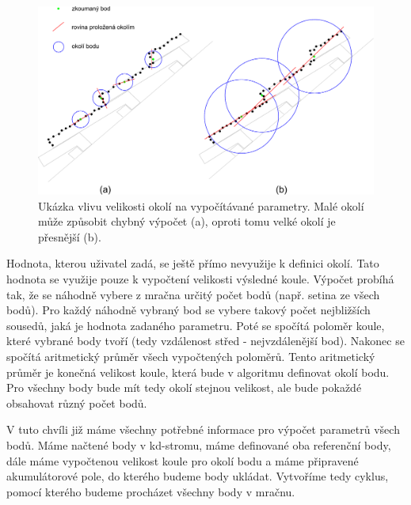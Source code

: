 \documentclass[11pt,twoside,a4paper]{book}
\begin{document}
\begin{figure}[ht]
\begin{center}
\includegraphics[width=\textwidth]{figures/strecha-all}
\caption{Ukázka vlivu velikosti okolí na vypočítávané parametry. Malé okolí může způsobit chybný výpočet (a), oproti tomu velké okolí je přesnější (b).}
\label{fig:strecha}
\end{center}
\end{figure}

Hodnota, kterou uživatel zadá, se ještě přímo nevyužije k definici okolí. Tato hodnota se využije pouze k vypočtení velikosti výsledné koule. Výpočet probíhá tak, že se náhodně vybere z mračna určitý počet bodů (např. setina ze všech bodů). Pro každý náhodně vybraný bod se vybere takový počet nejbližších sousedů, jaká je hodnota zadaného parametru. Poté se spočítá poloměr koule, které vybrané body tvoří (tedy vzdálenost střed - nejvzdálenější bod). Nakonec se spočítá aritmetický průměr všech vypočtených poloměrů. Tento aritmetický průměr je konečná velikost koule, která bude v algoritmu definovat okolí bodu. Pro všechny body bude mít tedy okolí stejnou velikost, ale bude pokaždé obsahovat různý počet bodů.

V tuto chvíli již máme všechny potřebné informace pro výpočet parametrů všech bodů. Máme načtené body v kd-stromu, máme definované oba referenční body, dále máme vypočtenou velikost koule pro okolí bodu a máme připravené akumulátorové pole, do kterého budeme body ukládat. Vytvoříme tedy cyklus, pomocí kterého budeme procházet všechny body v mračnu.
\end{document}
